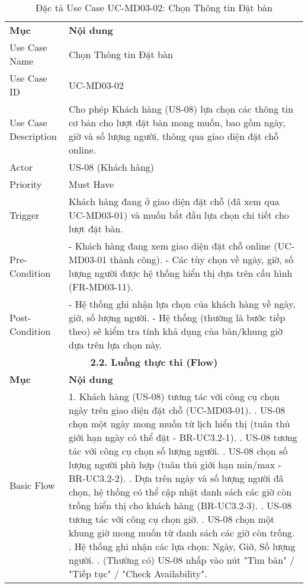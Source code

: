 \begin{longtable}{|m{4cm}|p{11cm}|}
\caption{Đặc tả Use Case UC-MD03-02: Chọn Thông tin Đặt bàn} \label{tab:uc_md03_02} \\
\hline

\endhead %
\hline
\endfoot %
\hline
\endlastfoot %
\multicolumn{2}{|c|}{\textbf{2.1. Tóm tắt (Summary)}} \\
\hline
\textbf{Mục} & \textbf{Nội dung} \\
\hline
Use Case Name & Chọn Thông tin Đặt bàn \\
\hline
Use Case ID & UC-MD03-02 \\
\hline
Use Case Description & Cho phép Khách hàng (US-08) lựa chọn các thông tin cơ bản cho lượt đặt bàn mong muốn, bao gồm ngày, giờ và số lượng người, thông qua giao diện đặt chỗ online. \\
\hline
Actor & US-08 (Khách hàng) \\
\hline
Priority & Must Have \\
\hline
Trigger & Khách hàng đang ở giao diện đặt chỗ (đã xem qua UC-MD03-01) và muốn bắt đầu lựa chọn chi tiết cho lượt đặt bàn. \\
\hline
Pre-Condition & - Khách hàng đang xem giao diện đặt chỗ online (UC-MD03-01 thành công). \newline - Các tùy chọn về ngày, giờ, số lượng người được hệ thống hiển thị dựa trên cấu hình (FR-MD03-11). \\
\hline
Post-Condition & - Hệ thống ghi nhận lựa chọn của khách hàng về ngày, giờ, số lượng người. \newline - Hệ thống (thường là bước tiếp theo) sẽ kiểm tra tính khả dụng của bàn/khung giờ dựa trên lựa chọn này. \\
\hline
\multicolumn{2}{|c|}{\textbf{2.2. Luồng thực thi (Flow)}} \\
\hline
\textbf{Mục} & \textbf{Nội dung} \\
\hline
Basic Flow & 1. Khách hàng (US-08) tương tác với công cụ chọn ngày trên giao diện đặt chỗ (UC-MD03-01). \newline 2. US-08 chọn một ngày mong muốn từ lịch hiển thị (tuân thủ giới hạn ngày có thể đặt - BR-UC3.2-1). \newline 3. US-08 tương tác với công cụ chọn số lượng người. \newline 4. US-08 chọn số lượng người phù hợp (tuân thủ giới hạn min/max - BR-UC3.2-2). \newline 5. Dựa trên ngày và số lượng người đã chọn, hệ thống có thể cập nhật danh sách các giờ còn trống hiển thị cho khách hàng (BR-UC3.2-3). \newline 6. US-08 tương tác với công cụ chọn giờ. \newline 7. US-08 chọn một khung giờ mong muốn từ danh sách các giờ còn trống. \newline 8. Hệ thống ghi nhận các lựa chọn: Ngày, Giờ, Số lượng người. \newline 9. (Thường có) US-08 nhấp vào nút "Tìm bàn" / "Tiếp tục" / "Check Availability". \\

\end{longtable}
